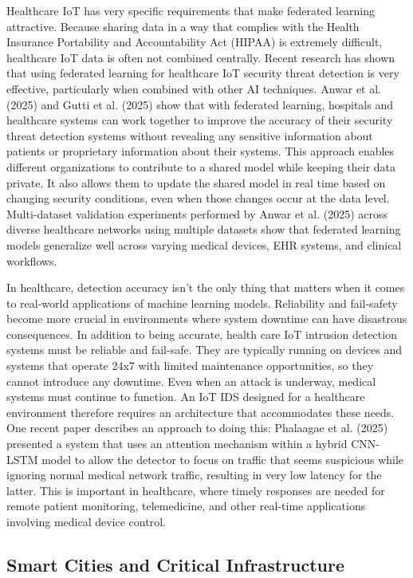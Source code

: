 \documentclass[12pt]{article}
\begin{document}
Healthcare IoT has very specific requirements that make federated learning attractive. Because sharing data in a way that complies with the Health Insurance Portability and Accountability Act (HIPAA) is extremely difficult, healthcare IoT data is often not combined centrally. Recent research has shown that using federated learning for healthcare IoT security threat detection is very effective, particularly when combined with other AI techniques. Anwar et al. (2025) and Gutti et al. (2025) show that with federated learning, hospitals and healthcare systems can work together to improve the accuracy of their security threat detection systems without revealing any sensitive information about patients or proprietary information about their systems. This approach enables different organizations to contribute to a shared model while keeping their data private. It also allows them to update the shared model in real time based on changing security conditions, even when those changes occur at the data level. Multi-dataset validation experiments performed by Anwar et al. (2025) across diverse healthcare networks using multiple datasets show that federated learning models generalize well across varying medical devices, EHR systems, and clinical workflows.

In healthcare, detection accuracy isn't the only thing that matters when it comes to real-world applications of machine learning models. Reliability and fail-safety become more crucial in environments where system downtime can have disastrous consequences.
In addition to being accurate, health care IoT intrusion detection systems must be reliable and fail-safe. They are typically running on devices and systems that operate 24x7 with limited maintenance opportunities, so they cannot introduce any downtime. Even when an attack is underway, medical systems must continue to function. An IoT IDS designed for a healthcare environment therefore requires an architecture that accommodates these needs. One recent paper describes an approach to doing this: Phalaagae et al. (2025) presented a system that uses an attention mechanism within a hybrid CNN-LSTM model to allow the detector to focus on traffic that seems suspicious while ignoring normal medical network traffic, resulting in very low latency for the latter. This is important in healthcare, where timely responses are needed for remote patient monitoring, telemedicine, and other real-time applications involving medical device control.

\subsection{Smart Cities and Critical Infrastructure}
\end{document}
